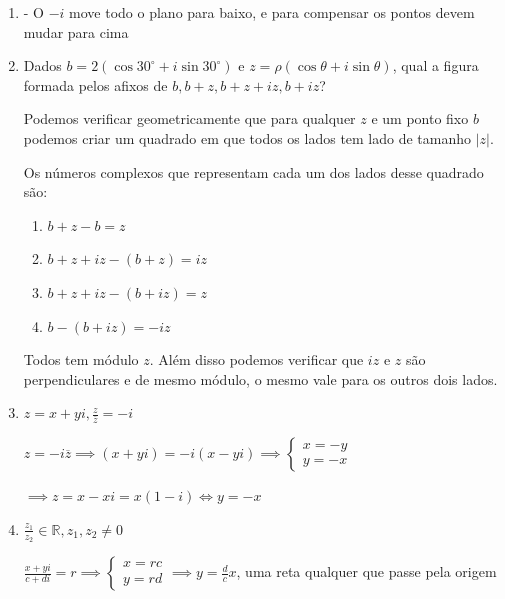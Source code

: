 \documentclass[12pt, openright, a4paper, twoside, english, brazil]{article}
\newenvironment{qitem}{
  \color{black}
\item}{\vspace{10pt}}
\newenvironment{qmitem}{
  \color{black}
\item
\begin{enumerate}[\bfseries a)]}{
\end{enumerate}\vspace{10pt}}
\newcommand{\cis}[1]{\displaystyle(\cos#1+i\sin#1)}
\begin{document}
\begin{enumerate}[\bfseries 1.]
\begin{qmitem}
    {\color{red}- O $-i$ move todo o plano para baixo, e para
    compensar os pontos devem mudar para cima}
  \end{qmitem}

  \begin{qitem} %
    Dados $b=2\cis{30^\circ}\text{ e } z=\rho\cis\theta$, qual a
    figura formada pelos afixos de $b,b+z,b+z+iz,b+iz$?

    \color{red}
    Podemos verificar geometricamente que para qualquer $z$ e um
    ponto fixo $b$ podemos criar um quadrado em que todos os lados
    tem lado de tamanho $|z|$.

    Os números complexos que representam cada um dos lados desse quadrado são:
    \begin{enumerate}[1. ]
      \item $b+z-b=z$
      \item $b+z+iz-(b+z)=iz$
      \item $b+z+iz-(b+iz)=z$
      \item $b-(b+iz)=-iz$
    \end{enumerate}

    Todos tem módulo $z$. Além disso podemos verificar que $iz$ e $z$
    são perpendiculares e de mesmo módulo, o mesmo vale para os
    outros dois lados.
  \end{qitem}

  \begin{qitem} %
    $\displaystyle z=x+yi,\frac{z}{\overline{z}}=-i$

    \color{red}
    $z=-i\overline{z}\implies (x+yi)=-i(x-yi)\implies
    \begin{cases}x=-y\\y=-x
    \end{cases}$

    $\implies z=x-xi=x(1-i)\iff y=-x$
  \end{qitem}

  \begin{qitem} %
    $\displaystyle\frac{z_1}{z_2}\in\mathbb R,z_1,z_2\ne0$

    \color{red}
    $\displaystyle\frac{x+yi}{c+di}=r\implies
    \begin{cases}x=rc\\y=rd
    \end{cases}\implies y=\frac{d}{c}x$, uma reta qualquer que passe pela origem
  \end{qitem}


\end{enumerate}
\end{document}
